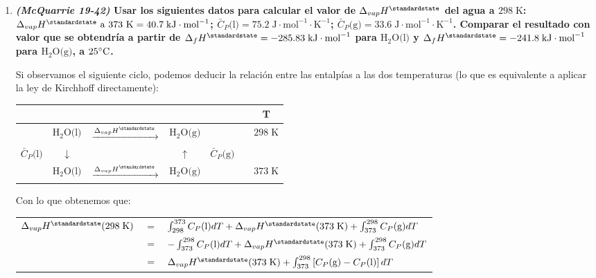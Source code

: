 \documentclass[a4paper,12pt]{article}
\begin{document}
\begin{enumerate}
As\'i que $\Delta_rH^\standardstate=+2.9\;\mbox{kJ}\cdot\mbox{mol}^{-1}$ para la reacci\'on dada.

\newpage

 \item \textbf{\textit{(McQuarrie 19-42)} Usar los siguientes datos para calcular el valor de $\Delta_{vap}H^\standardstate$ del agua a $298\;\mbox{K}$: $\Delta_{vap}H^\standardstate\mbox{ a 373 K}=40.7\;\mbox{kJ}\cdot\mbox{mol}^{-1}$; $\bar{C}_P\mbox{(l)}=75.2\;\mbox{J}\cdot\mbox{mol}^{-1}\cdot\mbox{K}^{-1}$; $\bar{C}_P\mbox{(g)}=33.6\;\mbox{J}\cdot\mbox{mol}^{-1}\cdot\mbox{K}^{-1}$. Comparar el resultado con valor que se obtendr\'ia a partir de $\Delta_{f}H^\standardstate=-285.83\;\mbox{kJ}\cdot\mbox{mol}^{-1}$ para $\mbox{H}_2\mbox{O(l)}$ y $\Delta_{f}H^\standardstate=-241.8\;\mbox{kJ}\cdot\mbox{mol}^{-1}$ para $\mbox{H}_2\mbox{O(g)}$, a $25\celsius$.} %

Si observamos el siguiente ciclo, podemos deducir la relaci\'on entre las entalp\'ias a las dos temperaturas (lo que es equivalente a aplicar la ley de Kirchhoff directamente):

\begin{center}
\begin{tabular}{r c c c l c | c}
& & & & & \quad & T \\\hline
& $\mbox{H}_2\mbox{O(l)}$ & $\xrightarrow{\Delta_{vap}H^\standardstate}$ & $\mbox{H}_2\mbox{O(g)}$ & & \quad\quad & $298\;\mbox{K}$ \\
 ${\bar{C}_P\mbox{(l)}}$ & $\downarrow$ & & $\uparrow$ & ${\bar{C}_P\mbox{(g)}}$ & \quad\quad & \\
& $\mbox{H}_2\mbox{O(l)}$ & $\xrightarrow{\Delta_{vap}H^\standardstate}$ & $\mbox{H}_2\mbox{O(g)}$ & & \quad\quad & $373\;\mbox{K}$ \\\hline
\end{tabular}
\end{center}

Con lo que obtenemos que:

\begin{tabular}{r c l}
$\Delta_{vap}H^\standardstate(298\;\mbox{K})$ & $=$ & $\int_{298}^{373}C_P\mbox{(l)}dT+\Delta_{vap}H^\standardstate(373\;\mbox{K})+\int_{373}^{298}C_P\mbox{(g)}dT$ \\
& $=$ & $-\int_{373}^{298}C_P\mbox{(l)}dT+\Delta_{vap}H^\standardstate(373\;\mbox{K})+\int_{373}^{298}C_P\mbox{(g)}dT$ \\
& $=$ & $\Delta_{vap}H^\standardstate(373\;\mbox{K})+\int_{373}^{298}\left[C_P\mbox{(g)}-C_P\mbox{(l)}\right]dT$ 
\end{tabular}


\end{enumerate}
\end{document}
